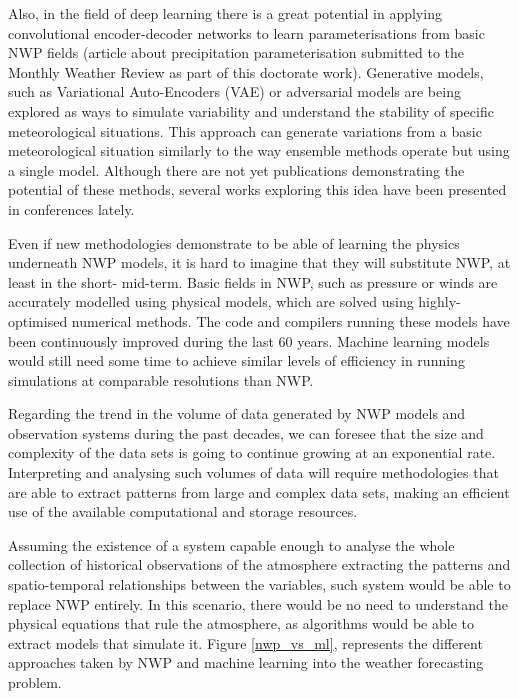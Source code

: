 Also, in the field of deep learning there is a great potential in applying convolutional encoder-decoder networks to learn parameterisations from basic NWP fields (article about precipitation parameterisation submitted to the Monthly Weather Review as part of this doctorate work). Generative models, such as Variational Auto-Encoders (VAE) \citep{kingma2013vae} or adversarial models \citep{goodfellow2014gan} are being explored as ways to simulate variability and understand the stability of specific meteorological situations. This approach can generate variations from a basic meteorological situation similarly to the way ensemble methods operate but using a single model. Although there are not yet publications demonstrating the potential of these methods, several works exploring this idea have been presented in conferences lately.

\medskip

Even if new methodologies demonstrate to be able of learning the physics underneath NWP models, it is hard to imagine that they will substitute NWP, at least in the short- mid-term. Basic fields in NWP, such as pressure or winds are accurately modelled using physical models, which are solved using highly-optimised numerical methods. The code and compilers running these models have been continuously improved during the last 60 years. Machine learning models would still need some time to achieve similar levels of efficiency in running simulations at comparable resolutions than NWP.

\medskip

Regarding the trend in the volume of data generated by NWP models and observation systems during the past decades, we can foresee that the size and complexity of the data sets is going to continue growing at an exponential rate. Interpreting and analysing such volumes of data will require methodologies that are able to extract patterns from large and complex data sets, making an efficient use of the available computational and storage resources. 

\medskip

Assuming the existence of a system capable enough to analyse the whole collection of historical observations of the atmosphere extracting the patterns and spatio-temporal relationships between the variables, such system would be able to replace NWP entirely. In this scenario, there would be no need to understand the physical equations that rule the atmosphere, as algorithms would be able to extract models that simulate it. Figure \ref{nwp_vs_ml}, represents the different approaches taken by NWP and machine learning into the weather forecasting problem.

